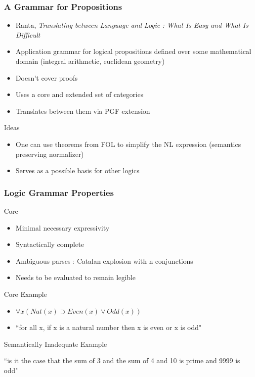 \documentclass[9pt]{beamer}
\begin{document}
\begin{frame}
\frametitle{A Grammar for Propositions}

\begin{itemize}
\item Ranta, \emph{Translating between Language and Logic : What Is Easy and What Is Difficult}
\item Application grammar for logical propositions defined over some mathematical
domain (integral arithmetic, euclidean geometry)
\item Doesn't cover proofs
\item Uses a core and extended set of categories
\item Translates between them via PGF extension
\end{itemize}

\begin{exampleblock}{Ideas}
\begin{itemize}
\item One can use theorems from FOL to simplify the
NL expression (semantics preserving normalizer)
\item Serves as a possible basis for other logics 
\end{itemize}
\end{exampleblock}

\end{frame}

\begin{frame}
\frametitle{Logic Grammar Properties}

\begin{block}{Core}
\begin{itemize}
\item Minimal necessary expressivity
\item Syntactically complete
\item Ambiguous parses : Catalan explosion with n conjunctions
\item Needs to be evaluated to remain legible 
\end{itemize}
\end{block}

\begin{exampleblock}{Core Example}
\begin{itemize}
\item $\forall x (Nat(x) \supset Even(x) \lor Odd(x))$
\item ``for all x, if x is a natural number then x is even or x is odd"
\end{itemize}
\end{exampleblock}

\begin{exampleblock}{Semantically Inadequate Example}

``is it the case that the sum of 3 and the sum of 4 and 10 is prime and 9999 is odd"

\end{exampleblock}
\end{frame}
\end{document}
